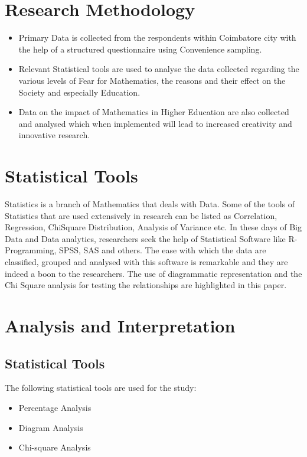 \documentclass{article}
\begin{document}
\section{Research Methodology}
\begin{itemize}
    \item Primary Data is collected from the respondents within Coimbatore city with the help of a structured questionnaire using Convenience sampling.
    \item Relevant Statistical tools are used to analyse the data collected regarding the various levels of Fear for Mathematics, the reasons and their effect on the Society and especially Education. 
    \item Data on the impact of Mathematics in Higher Education are also collected and analysed which when implemented will lead to increased creativity and innovative research.
\end{itemize}
\cite{gallagher2005gender}

\section{Statistical Tools}
Statistics is a branch of Mathematics that deals with Data. Some of the tools of Statistics that are used extensively in research can be listed as Correlation, Regression, ChiSquare Distribution, Analysis of Variance etc. In these days of Big Data and Data analytics, researchers seek the help of Statistical Software like R-Programming, SPSS, SAS and others. The ease with which the data are classified, grouped and analysed with this software is
remarkable and they are indeed a boon to the researchers. The use of diagrammatic representation and the Chi Square analysis for testing the relationships are highlighted in this
paper.

\section{Analysis and Interpretation}
\subsection{Statistical Tools}
The following statistical tools are used for the study:
\begin{itemize}
    \item Percentage Analysis
    \item Diagram Analysis
    \item Chi-square Analysis
\end{itemize}
\end{document}

